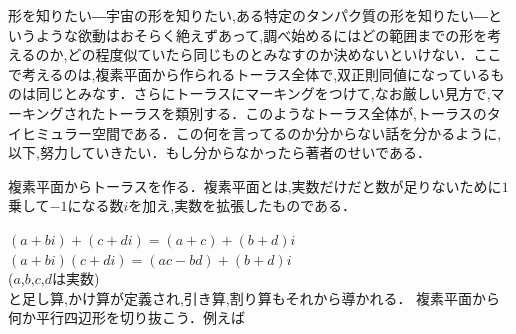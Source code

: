 


形を知りたい―宇宙の形を知りたい,ある特定のタンパク質の形を知りたい―というような欲動はおそらく絶えずあって,調べ始めるにはどの範囲までの形を考えるのか,どの程度似ていたら同じものとみなすのか決めないといけない．ここで考えるのは,複素平面から作られるトーラス全体で,双正則同値になっているものは同じとみなす．さらにトーラスにマーキングをつけて,なお厳しい見方で,マーキングされたトーラスを類別する．このようなトーラス全体が,トーラスのタイヒミュラー空間である．この何を言ってるのか分からない話を分かるように,以下,努力していきたい．もし分からなかったら著者のせいである．

複素平面からトーラスを作る．複素平面とは,実数だけだと数が足りないために$1$乗して$-1$になる数$i$を加え,実数を拡張したものである．
\begin{figure} 
\end{figure}
$(a+bi)+(c+di)=(a+c)+(b+d)i$\\
$(a+bi)(c+di)=(ac-bd)+(b+d)i$\\
($a$,$b$,$c$,$d$は実数)\\
と足し算,かけ算が定義され,引き算,割り算もそれから導かれる．
複素平面から何か平行四辺形を切り抜こう．例えば\\

